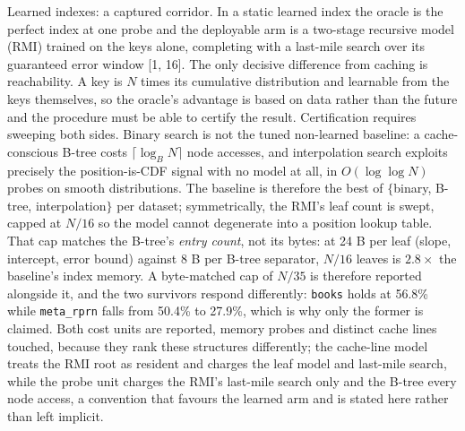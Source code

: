 \documentclass[letterpaper]{article} %
\begin{document}
Learned indexes: a captured corridor. In a static learned index the oracle is the perfect index at one probe and the deployable arm is a two-stage recursive model (RMI) trained on the keys alone, completing with a last-mile search over its guaranteed error window [1, 16]. The only decisive difference from caching is reachability. A key is $N$ times its cumulative distribution and learnable from the keys themselves, so the oracle's advantage is based on data rather than the future and the procedure must be able to certify the result.
Certification requires sweeping both sides. Binary search is not the tuned non-learned baseline: a cache-conscious B-tree \citep{ccbtree} costs $\lceil\log_{B} N\rceil$ node accesses, and interpolation search \citep{interp} exploits precisely the position-is-CDF signal with no model at all, in $O(\log\log N)$ probes on smooth distributions. The baseline is therefore the best of $\{$binary, B-tree, interpolation$\}$ per dataset; symmetrically, the RMI's leaf count is swept, capped at $N/16$ so the model cannot degenerate into a position lookup table. That cap matches the B-tree's \emph{entry count}, not its bytes: at 24 B per leaf (slope, intercept, error bound) against 8 B per B-tree separator, $N/16$ leaves is $2.8\times$ the baseline's index memory. A byte-matched cap of $N/35$ is therefore reported alongside it, and the two survivors respond differently: \texttt{books} holds at 56.8\% while \texttt{meta\_rprn} falls from 50.4\% to 27.9\%, which is why only the former is claimed. Both cost units are reported, memory probes and distinct cache lines touched, because they rank these structures differently; the cache-line model treats the RMI root as resident and charges the leaf model and last-mile search, while the probe unit charges the RMI's last-mile search only and the B-tree every node access, a convention that favours the learned arm and is stated here rather than left implicit.
\end{document}
